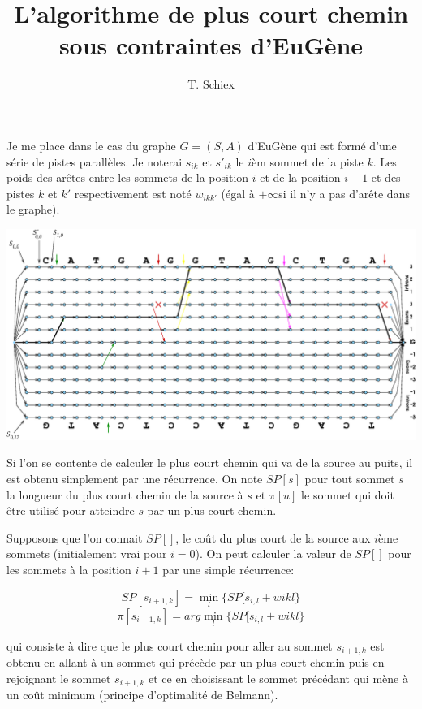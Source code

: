 \documentclass[a4paper]{article}
\title{L'algorithme de plus court chemin sous contraintes d'EuG\`ene}
\author{T. Schiex}
\begin{document}
\maketitle

Je me place dans le cas du graphe $G=(S,A)$ d'EuG\`ene qui est form\'e
d'une s\'erie de pistes parall\`eles. Je noterai $s_{ik}$ et $s'_{ik}$ le
$i$\`em sommet de la piste $k$. Les poids des ar\^etes entre les sommets
de la position $i$ et de la position $i+1$ et des pistes $k$ et $k'$
respectivement est not\'e $w_{ikk'}$ (\'egal \`a $+\infty$si il n'y a pas
d'ar\^ete dans le graphe).

\begin{center}
  \includegraphics[width=\textwidth]{graph}
\end{center}

Si l'on se contente de calculer le plus court chemin qui va de la
source au puits, il est obtenu simplement par une r\'ecurrence. On note
$SP[s]$ pour tout sommet $s$ la longueur du plus court chemin de la
source \`a $s$ et $\pi[u]$ le sommet qui doit \^etre utilis\'e pour
atteindre $s$ par un plus court chemin.

Supposons que l'on connait $SP[]$, le co\^ut du plus court de la source
aux $i$\`eme sommets (initialement vrai pour $i=0$). On peut calculer la
valeur de $SP[]$ pour les sommets \`a la position $i+1$ par une simple
r\'ecurrence:

\[SP[s_{i+1,k}] = \min_l \{ SP[s_{i,l}+w{ikl}\}\]
\[\pi[s_{i+1,k}] = arg\min_l \{ SP[s_{i,l}+w{ikl}\}\]

qui consiste \`a dire que le plus court chemin pour aller au sommet
$s_{i+1,k}$ est obtenu en allant \`a un sommet qui pr\'ec\`ede par un plus
court chemin puis en rejoignant le sommet $s_{i+1,k}$ et ce en
choisissant le sommet pr\'ec\'edant qui m\`ene \`a un co\^ut minimum (principe
d'optimalit\'e de Belmann).
\end{document}
